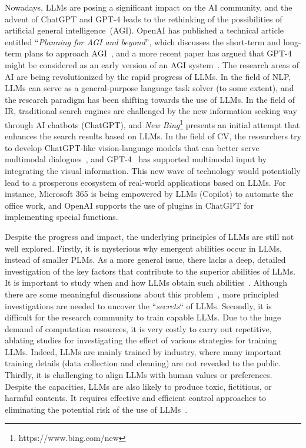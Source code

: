 Nowadays,  LLMs are posing a significant impact on the AI community, and the advent of ChatGPT and GPT-4 leads to the rethinking of the possibilities of artificial general intelligence~(AGI). OpenAI has published a technical article entitled ``\emph{Planning for AGI and beyond}'', which discusses the short-term and long-term plans to approach  AGI~\cite{OpenAI-blog-2023-Planning}, and a more recent paper has argued that GPT-4 might be considered as an early version of an AGI system~\cite{Bubeck-arxiv-2023-Sparks}. 
The research areas of AI are being revolutionized by the rapid progress of LLMs. 
In the field of NLP,  LLMs can serve as a general-purpose  language task solver (to some extent), and  the research paradigm has been shifting towards the use of LLMs. 
In the field of IR, traditional search engines are challenged by the new information seeking way through AI chatbots (\ie ChatGPT), and  \emph{New Bing}\footnote{https://www.bing.com/new} presents an initial attempt that enhances  the search results based on LLMs. 
In the field of  CV, the researchers  try to develop ChatGPT-like vision-language models that can better serve multimodal dialogues~\cite{Huang-CoRR-2023,Cao-arxiv-2023-comprehensive, driess-arxiv-2023-palm,wu-arxiv-2023-visual}, and  GPT-4~\cite{OpenAI-OpenAI-2023-GPT-4} has  supported multimodal input by integrating the visual information.  
This new wave of technology would potentially lead to a prosperous
 ecosystem of real-world applications based on LLMs. 
For instance, Microsoft 365  is being empowered by  LLMs (\ie Copilot) to automate the office work, and OpenAI supports the use of   plugins in ChatGPT for implementing special functions.  
 

Despite the  progress and impact,  the underlying principles of LLMs are still not well explored. Firstly, it is  mysterious   why emergent abilities occur in  LLMs,   instead of smaller PLMs. As a more general issue, there  lacks a deep, detailed investigation of the key factors that contribute to the superior abilities of LLMs. 
It is important to study when and how LLMs obtain such abilities~\cite{FU-blog-2022-how}. Although there are some meaningful discussions about this problem~\cite{Wei-arxiv-2022-Emergent,FU-blog-2022-how}, more principled investigations are needed to uncover the ``\emph{secrets}`` of LLMs. 
Secondly, it is difficult for the research community to train capable LLMs.  
Due to the huge demand of computation resources, it is very costly to carry out repetitive, ablating studies for investigating the effect of various strategies for training LLMs. 
Indeed,  LLMs are mainly trained by industry, where many important training details (\eg data collection and cleaning) are not revealed to the public. 
Thirdly, it is  challenging to align LLMs with human values or preferences. Despite the capacities, LLMs are also likely to produce toxic, fictitious, or harmful contents. It requires effective and efficient control approaches  to  eliminating the potential risk of the use of LLMs~\cite{OpenAI-OpenAI-2023-GPT-4}.  


